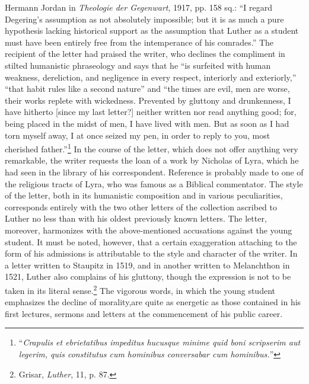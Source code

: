 {Hermann Jordan in \textit{Theologie der Gegenwart}, 1917, pp. 158 sq.: “I regard Degering’s
assumption as not absolutely impossible; but it is as much a pure hypothesis lacking historical support as the assumption that Luther as a student must have been entirely free
from the intemperance of his comrades.”}
The recipient of the letter had praised the writer, who declines the compliment
in stilted humanistic phraseology and says that he “is surfeited
with human weakness, dereliction, and negligence in every
respect, interiorly and exteriorly,” “that habit rules like a second
nature” and “the times are evil, men are worse, their works replete
with wickedness. Prevented by gluttony and drunkenness, I have
hitherto [since my last letter?] neither written nor read anything
good; for, being placed in the midst of men, I have lived with men.
But as soon as I had torn myself away, I at once seized my pen,
in order to reply to you, most cherished father.”\footnote
{“\textit{Crapulis et ebrietatibus impeditus hucusque minime quid boni scripserim aut legerim,
quis constitutus cum hominibus conversabar cum hominibus.}”}
In the course of the letter, which does not offer anything very remarkable, the writer
requests the loan of a work by Nicholas of Lyra, which he had seen
in the library of his correspondent. Reference is probably made to
one of the religious tracts of Lyra, who was famous as a Biblical
commentator. The style of the letter, both in its humanistic composition
and in various peculiarities, corresponds entirely with the two
other letters of the collection ascribed to Luther no less than with his
oldest previously known letters. The letter, moreover, harmonizes
with the above-mentioned accusations against the young student. It
must be noted, however, that a certain exaggeration attaching to
the form of his admissions is attributable to the style and character
of the writer. In a letter written to Staupitz in 1519, and in
another written to Melanchthon in 1521, Luther also complains of his
gluttony, though the expression is not to be taken in its literal sense.\footnote{Grisar, \textit{Luther}, 11, p. 87.}
The vigorous words, in which the young student emphasizes
the decline of morality,are quite as energetic as those contained in
his first lectures, sermons and letters at the commencement of his
public career.

